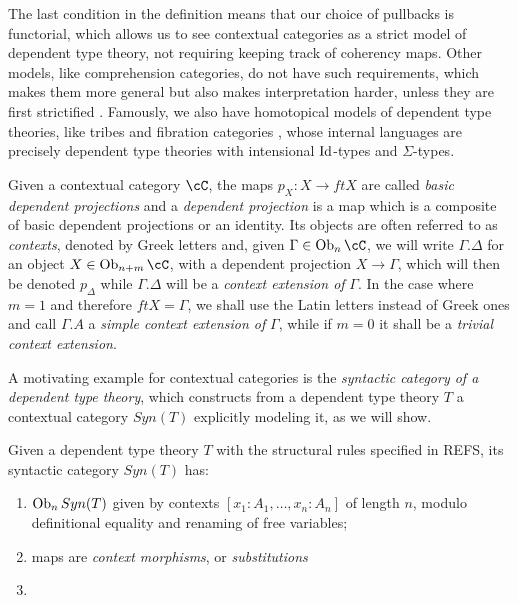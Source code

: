 \documentclass[a4paper,fontsize=12pt]{scrartcl}
\begin{document}
\begin{rmk}
  The last condition in the definition means that our choice of pullbacks is
  functorial, which allows us to see contextual categories as a strict model of
  dependent type theory, not requiring keeping track of coherency maps.
  Other models, like comprehension categories, do not
  have such requirements, which makes them more general but also makes
  interpretation harder, unless they are first strictified . Famously, we also have homotopical models of dependent type
  theories, like tribes and fibration categories , whose
  internal languages are precisely dependent type theories with intensional
  $\operatorname{Id}$-types and $\Sigma$-types.
\end{rmk}

\begin{rmk}
  Given a contextual category $\cC$, the maps $p_X\colon X\rightarrow ftX$ are
  called \emph{basic dependent projections} and a \emph{dependent projection}
  is a map which is a composite of basic dependent projections or an identity.
  Its objects are
  often referred to as \emph{contexts}, denoted by Greek letters and, given
  $\Gamma\in\Ob_n\cC$, we will
  write $\Gamma.\Delta$ for an object $X\in\Ob_{n+m}\cC$, with a
  dependent projection $X\rightarrow\Gamma$, which will then be denoted
  $p_\Delta$ while $\Gamma.\Delta$ will be a \emph{context extension of}
  $\Gamma$. In the case where $m=1$ and therefore $ftX=\Gamma$, we shall use
  the Latin letters instead of Greek ones and call $\Gamma.A$ a \emph{simple
  context extension of} $\Gamma$, while if $m=0$ it shall be a
  \emph{trivial context extension}.
\end{rmk}

A motivating example for contextual categories is the \emph{syntactic category
of a dependent type theory}, which constructs from a dependent type theory $T$ a
contextual category $Syn(T)$ explicitly modeling it, as we will show.

\begin{construction}
  Given a dependent type theory $T$ with the structural rules specified in REFS,
  its syntactic category $Syn(T)$ has:
  \begin{enumerate}
    \item $\operatorname{Ob}_nSyn(T)$ given by contexts $[x_1:A_1,\ldots,x_n:A_n]$ of length
      $n$, modulo definitional equality and renaming of free variables;
    \item maps are \emph{context morphisms}, or \emph{substitutions}
    \item {}
  \end{enumerate}
\end{construction}
\end{document}
